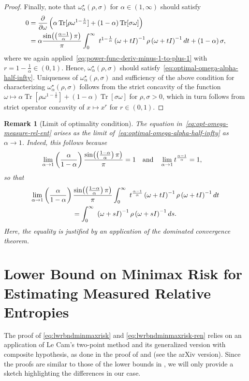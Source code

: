 \documentclass[a4paper,onecolumn,11pt,accepted=2026-05-12]{quantumarticle}
\newtheorem{remark}{Remark}
\DeclareMathOperator{\Tr}{Tr}
\begin{document}
\begin{proof}
Finally, note that $\omega_{\alpha}^{\star}(\rho,\sigma)$ for $\alpha \in (1,\infty)$ should satisfy 
\begin{align}
 0&= \frac{\partial}{\partial\omega}\left(\alpha\Tr[\rho\omega^{1-\frac{1}{\alpha}}]+\left(1-\alpha\right)\Tr[\sigma\omega]\right)\nonumber \\
  & =\alpha\frac{\sin\!\left(\left(\frac{\alpha-1}{\alpha}\right)\pi\right)}{\pi}\int_{0}^{\infty}\ t^{1-\frac{1}{\alpha}}\left(\omega+tI\right)^{-1}\rho\left(\omega+tI\right)^{-1}dt+\left(1-\alpha\right)\sigma, \notag
\end{align}
where we again applied~\eqref{eq:power-func-deriv-minus-1-to-plus-1} with $r=1-\frac{1}{\alpha}\in\left(0,1\right)$. Hence, 
 $\omega_{\alpha}^{\star}(\rho,\sigma)$ should satisfy~\eqref{eq:optimal-omega-alpha-half-infty}. 
Uniqueness of  $\omega_{\alpha}^{\star}(\rho,\sigma)$ and sufficiency of the above condition for characterizing $\omega_{\alpha}^{\star}(\rho,\sigma)$ follows from the strict concavity of the
function $\omega\mapsto\alpha\Tr[\rho\omega^{1-\frac{1}{\alpha}}]+\left(1-\alpha\right)\Tr[\sigma\omega]$
for $\rho,\sigma>0$, which in turn follows from strict operator concavity of  $x \mapsto  x^r$ for $r \in (0,1)$. 
\end{proof}
\begin{remark}[Limit of optimality condition]
The equation in~\eqref{eq:opt-omega-measure-rel-ent} arises as the
limit of~\eqref{eq:optimal-omega-alpha-half-infty} as $\alpha\to1$.
Indeed, this follows because
\begin{align}
\lim_{\alpha\to1}\left(\frac{\alpha}{1-\alpha}\right)\frac{\sin\!\left(\left(\frac{1-\alpha}{\alpha}\right)\pi\right)}{\pi} & =1 \quad \mbox{and} \quad \notag 
\lim_{\alpha\to1}t^{\frac{\alpha-1}{\alpha}}  =1, \notag 
\end{align}
so that
\begin{multline}
\lim_{\alpha\to1}\left(\frac{\alpha}{1-\alpha}\right)\frac{\sin\!\left(\left(\frac{1-\alpha}{\alpha}\right)\pi\right)}{\pi}\int_{0}^{\infty}\ t^{\frac{\alpha-1}{\alpha}}\left(\omega+tI\right)^{-1}\rho\left(\omega+tI\right)^{-1}dt\\
=\int_{0}^{\infty}\ \left(\omega+sI\right)^{-1}\rho\left(\omega+sI\right)^{-1}ds.\notag 
\end{multline}
Here, the equality is justified by an application of the dominated convergence theorem.
\end{remark}

\section{Lower Bound on Minimax Risk for Estimating Measured Relative Entropies}
\label{App:lowerbndest}
The proof of   \eqref{eq:lwrbndminmaxrisk} and \eqref{eq:lwrbndminmaxrisk-ren} relies  on an application of  Le Cam's two-point method and its generalized version with composite hypothesis,  as done in the proof of \cite[Proposition~2 and 3]{Yihong-Yang-2016} and \cite[Theorems~1 and~2]{Yanjun-2020-alphadiv} (see the arXiv version). Since the proofs are similar to those of the lower bounds in \cite{Yanjun-2020-alphadiv}, we will only provide a sketch highlighting the differences in our case. 
\end{document}
